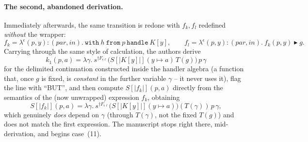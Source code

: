 \documentclass[11pt]{article}
\theoremstyle{plain}
\newcommand{\eps}{\epsilon}
\newcommand{\dg}[1]{^{\dagger #1}}
\begin{document}
\paragraph{The second, abandoned derivation.} Immediately afterwards, the same transition is
redone with $f_k,f_l$ redefined \emph{without} the wrapper:
\[
  f_k = \lambda^\eps(p,y){:}(\mathit{par},\mathit{in}).\ \mathtt{with}\ h\ \mathtt{from}\ p\ \mathtt{handle}\ K[y],
  \qquad
  f_l = \lambda^\eps(p,y){:}(\mathit{par},\mathit{in}).\ f_k(p,y)\blacktriangleright g.
\]
Carrying through the same style of calculation, the authors derive
\[
  k_1(p,a) = \lambda\gamma.\ s\dg{F_{\eps\ell}}\big(S[|K[y]|](y{\mapsto}a)\,T(g)\big)\,p\,\gamma
\]
for the delimited continuation constructed inside the handler algebra (a function that, once
$g$ is fixed, is \emph{constant} in the further variable $\gamma$ -- it never uses it), flag the
line with ``BUT'', and then compute $S[|f_k|](p,a)$ directly from the semantics of the (now
unwrapped) expression $f_k$, obtaining
\[
  S[|f_k|](p,a) = \lambda\gamma.\ s\dg{F_{\eps\ell}}\big(S[|K[y]|](y{\mapsto}a)\big)(T(\gamma))\,p\,\gamma,
\]
which genuinely \emph{does} depend on $\gamma$ (through $T(\gamma)$, not the fixed $T(g)$) and
does not match the first expression. The manuscript stops right there, mid-derivation, and
begins case~(11).
\end{document}
